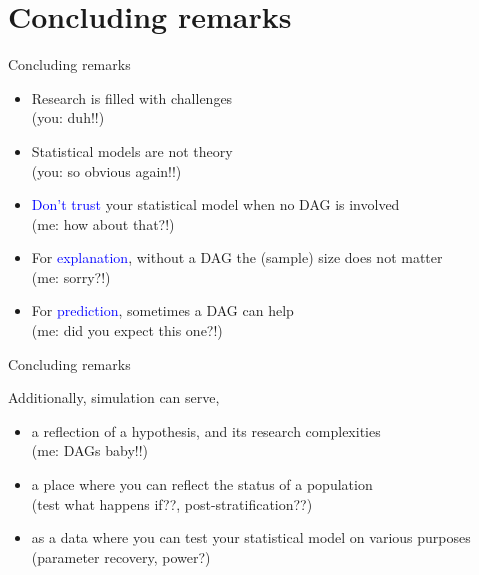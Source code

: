 \section{Concluding remarks}
%
\begin{frame}[negative]
	\sectionpage
\end{frame}
%
%
\begin{lhframe}[rhgraphic={\texttt{[image: think1.jpg]}}]
	{Concluding remarks}
	
	\begin{itemize}
		\item Research is filled with challenges \\
		{\small (you: duh!!) }
		\item Statistical models are not theory \\
		{\small (you: so obvious again!!) }
		\item \textcolor{blue}{Don't trust} your statistical model when no DAG is involved \\
		{\small (me: how about that?!) }
		\item For \textcolor{blue}{explanation}, without a DAG the (sample) size does not matter \\
		{\small (me: sorry?!) }
		\item For \textcolor{blue}{prediction}, sometimes a DAG can help \\
		{\small (me: did you expect this one?!)}
	\end{itemize} 
\end{lhframe}
%
%
\begin{lhframe}[rhgraphic={\texttt{[image: think2.jpg]}}]
	{Concluding remarks}
	
	Additionally, simulation can serve,
	\begin{itemize}
		\item a reflection of a hypothesis, and its research complexities\\
		{\small (me: DAGs baby!!)}
		\item a place where you can reflect the status of a population \\
		{\small (test what happens if??, post-stratification??) }
		\item as a data where you can test your statistical model on various purposes \\
		{\small (parameter recovery, power?) }
	\end{itemize} 
\end{lhframe}
%
%